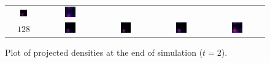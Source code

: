 \documentclass{article}
\begin{document}
\begin{figure}[ht]
\begin{tabular}{cccc|c}
\includegraphics[width=0.22\textwidth]{s42r64s20psi3.png} &
\includegraphics[width=0.22\textwidth]{s42r64s20psi1_scalar.png} \\
$128$ & 
\includegraphics[width=0.22\textwidth]{s42r128s20psi1.png} &
\includegraphics[width=0.22\textwidth]{s42r128s20psi2.png} &
\includegraphics[width=0.22\textwidth]{s42r128s20psi3.png} & 
\includegraphics[width=0.22\textwidth]{s42r128s20psi1_scalar.png} \\
\end{tabular}
\caption{Plot of projected densities at the end of simulation ($t=2$).}
\end{figure}
\end{document}
